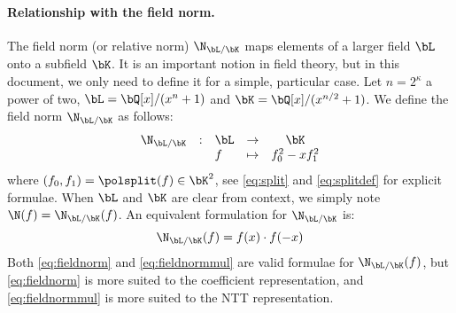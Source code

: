 
\paragraph{Relationship with the field norm.} The field norm (or relative norm) $\N_{\bL/\bK}$ maps elements of a larger field $\bL$ onto a subfield $\bK$. It is an important notion in field theory, but in this document, we only need to define it for a simple, particular case. Let $n = 2^\kappa$ a power of two, $\bL = \bQ[x]/(x^{n} + 1)$ and $\bK = \bQ[x]/(x^{n/2} + 1)$. We define the field norm $\N_{\bL/\bK}$ as follows:
\begin{equation}\label{eq:fieldnorm}
\begin{array}{llllc}
\N_{\bL/\bK} & : & \bL & \rightarrow & \bK \\
& & f & \mapsto & f_0^2 - x f_1^2
\end{array}
\end{equation}
where $(f_0,f_1) = \polsplit(f) \in \bK^2$, see \eqref{eq:split} and \eqref{eq:splitdef} for explicit formulae. When $\bL$ and $\bK$ are clear from context, we simply note $\N(f) = \N_{\bL/\bK}(f)$. An equivalent formulation for $\N_{\bL/\bK}$ is:
\begin{equation}\label{eq:fieldnormmul}
\N_{\bL/\bK} (f) = f(x) \cdot f(-x)
\end{equation}
Both \eqref{eq:fieldnorm} and \eqref{eq:fieldnormmul} are valid formulae for $\N_{\bL/\bK}(f)$, but \eqref{eq:fieldnorm} is more suited to the coefficient representation, and \eqref{eq:fieldnormmul} is more suited to the NTT representation.
